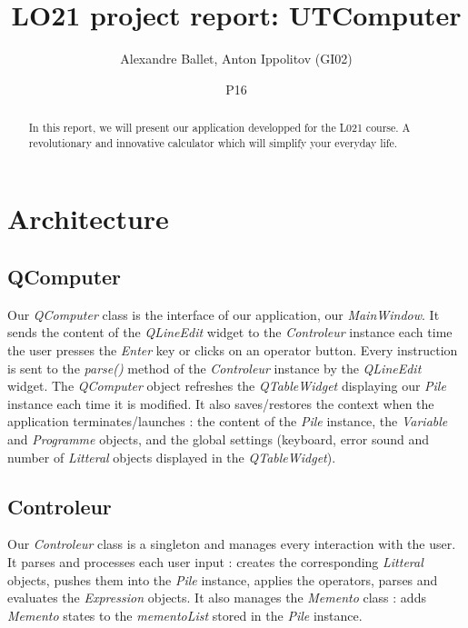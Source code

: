 \documentclass[titlepage]{article}
\begin{document}
\title{LO21 project report: UTComputer}
\author{Alexandre Ballet, Anton Ippolitov (GI02)}
\date{P16}
\maketitle

\tableofcontents

\begin{abstract}
In this report, we will present our application developped for the L021 course. A revolutionary and innovative calculator which will simplify your everyday life.
\end{abstract}

\section{Architecture}

    \subsection{QComputer}

    Our \textit{QComputer} class is the interface of our application, our \textit{MainWindow}. It sends the content of the \textit{QLineEdit} widget to the \textit{Controleur} instance each time the user presses the \textit{Enter} key or clicks on an operator button. Every instruction is sent to the \textit{parse()} method of the \textit{Controleur} instance by the \textit{QLineEdit} widget. The \textit{QComputer} object refreshes the \textit{QTableWidget} displaying our \textit{Pile} instance each time it is modified.
    It also saves/restores the context when the application terminates/launches : the content of the \textit{Pile} instance, the \textit{Variable} and \textit{Programme} objects, and the global settings (keyboard, error sound and number of \textit{Litteral} objects displayed in the \textit{QTableWidget}).\\

    \subsection{Controleur}

    Our \textit{Controleur} class is a singleton and manages every interaction with the user. It parses and processes each user input : creates the corresponding \textit{Litteral} objects, pushes them into the \textit{Pile} instance, applies the operators, parses and evaluates the \textit{Expression} objects. It also manages the \textit{Memento} class : adds \textit{Memento} states to the \textit{mementoList} stored in the \textit{Pile} instance.\\
\end{document}
